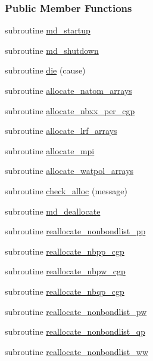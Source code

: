 \subsubsection*{Public Member Functions}
\begin{DoxyCompactItemize}
\item 
subroutine \hyperlink{classmd_a1be92336e25695d19c7ff9112a0d8221}{md\-\_\-startup}
\item 
subroutine \hyperlink{classmd_a8725d34e027d153e7ee366fe7f814b36}{md\-\_\-shutdown}
\item 
subroutine \hyperlink{classmd_ac21e43139b5e5cd74ab6649672288d66}{die} (cause)
\item 
subroutine \hyperlink{classmd_a789c388d1b4bce615f49be6c076ad5e1}{allocate\-\_\-natom\-\_\-arrays}
\item 
subroutine \hyperlink{classmd_a2b1b7aece324f88ae6f15ec47969f1a2}{allocate\-\_\-nbxx\-\_\-per\-\_\-cgp}
\item 
subroutine \hyperlink{classmd_a44425892c37b9eef58b445f76eee0754}{allocate\-\_\-lrf\-\_\-arrays}
\item 
subroutine \hyperlink{classmd_a1fab8f0bfda2d818ad01853875601a14}{allocate\-\_\-mpi}
\item 
subroutine \hyperlink{classmd_a2564982a0735344e348455d0f6aa53bd}{allocate\-\_\-watpol\-\_\-arrays}
\item 
subroutine \hyperlink{classmd_aa2bff9009b880be7904efe2a7c07f646}{check\-\_\-alloc} (message)
\item 
subroutine \hyperlink{classmd_a8a97b1726d386da7fddf5ea29296b0e9}{md\-\_\-deallocate}
\item 
subroutine \hyperlink{classmd_a262f50d109fc70ca812e85ddeb684728}{reallocate\-\_\-nonbondlist\-\_\-pp}
\item 
subroutine \hyperlink{classmd_af66ca4a315dcc0890b77cd90b0fdaa94}{reallocate\-\_\-nbpp\-\_\-cgp}
\item 
subroutine \hyperlink{classmd_a99eee4f01dbdcd76dbed4be5691d6d68}{reallocate\-\_\-nbpw\-\_\-cgp}
\item 
subroutine \hyperlink{classmd_ad6f184dc723190ff46edab4caf4b10e2}{reallocate\-\_\-nbqp\-\_\-cgp}
\item 
subroutine \hyperlink{classmd_ac0b1ffca7139683663c0ebb7903a90c0}{reallocate\-\_\-nonbondlist\-\_\-pw}
\item 
subroutine \hyperlink{classmd_a33602a45f142caf0421adb4f16cee39a}{reallocate\-\_\-nonbondlist\-\_\-qp}
\item 
subroutine \hyperlink{classmd_abc46c1881f91ca0af21a94bab664a348}{reallocate\-\_\-nonbondlist\-\_\-ww}

\end{DoxyCompactItemize}
